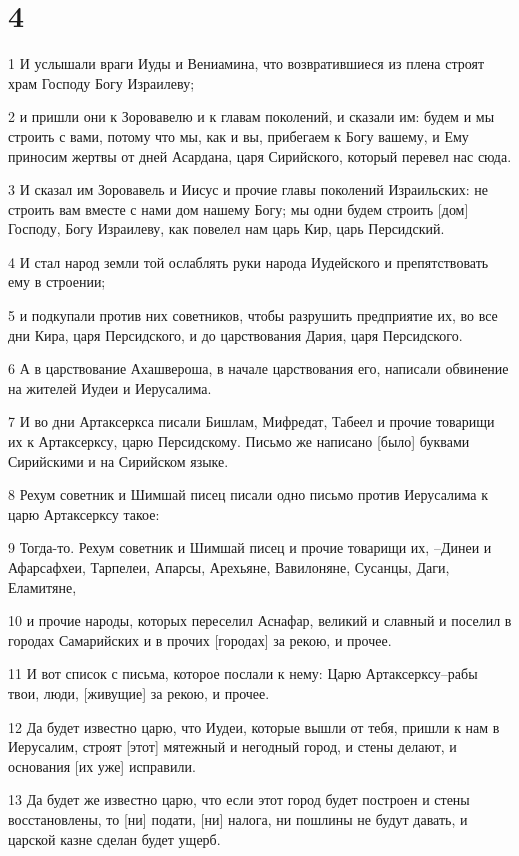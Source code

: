 \chapter{4}

\par 1 И услышали враги Иуды и Вениамина, что возвратившиеся из плена строят храм Господу Богу Израилеву;
\par 2 и пришли они к Зоровавелю и к главам поколений, и сказали им: будем и мы строить с вами, потому что мы, как и вы, прибегаем к Богу вашему, и Ему приносим жертвы от дней Асардана, царя Сирийского, который перевел нас сюда.
\par 3 И сказал им Зоровавель и Иисус и прочие главы поколений Израильских: не строить вам вместе с нами дом нашему Богу; мы одни будем строить [дом] Господу, Богу Израилеву, как повелел нам царь Кир, царь Персидский.
\par 4 И стал народ земли той ослаблять руки народа Иудейского и препятствовать ему в строении;
\par 5 и подкупали против них советников, чтобы разрушить предприятие их, во все дни Кира, царя Персидского, и до царствования Дария, царя Персидского.
\par 6 А в царствование Ахашвероша, в начале царствования его, написали обвинение на жителей Иудеи и Иерусалима.
\par 7 И во дни Артаксеркса писали Бишлам, Мифредат, Табеел и прочие товарищи их к Артаксерксу, царю Персидскому. Письмо же написано [было] буквами Сирийскими и на Сирийском языке.
\par 8 Рехум советник и Шимшай писец писали одно письмо против Иерусалима к царю Артаксерксу такое:
\par 9 Тогда-то. Рехум советник и Шимшай писец и прочие товарищи их, --Динеи и Афарсафхеи, Тарпелеи, Апарсы, Арехьяне, Вавилоняне, Сусанцы, Даги, Еламитяне,
\par 10 и прочие народы, которых переселил Аснафар, великий и славный и поселил в городах Самарийских и в прочих [городах] за рекою, и прочее.
\par 11 И вот список с письма, которое послали к нему: Царю Артаксерксу--рабы твои, люди, [живущие] за рекою, и прочее.
\par 12 Да будет известно царю, что Иудеи, которые вышли от тебя, пришли к нам в Иерусалим, строят [этот] мятежный и негодный город, и стены делают, и основания [их уже] исправили.
\par 13 Да будет же известно царю, что если этот город будет построен и стены восстановлены, то [ни] подати, [ни] налога, ни пошлины не будут давать, и царской казне сделан будет ущерб.
